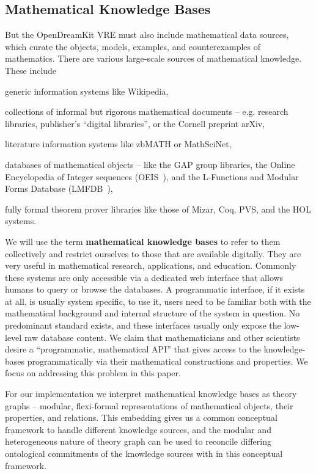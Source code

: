 \subsection{Mathematical Knowledge Bases}\label{sec:mkb}

But the \textsf{OpenDreamKit} VRE must also include mathematical data sources, which
curate the objects, models, examples, and counterexamples of mathematics.  There are
various large-scale sources of mathematical knowledge.  These include
\begin{compactitem}
\item generic information systems like Wikipedia,
\item collections of informal but rigorous mathematical documents -- e.g. research libraries, publisher's ``digital libraries'', or the Cornell preprint arXiv,
\item literature information systems like zbMATH or MathSciNet,
\item databases of mathematical objects -- like the GAP group libraries, the Online Encyclopedia of Integer sequences (OEIS~\cite{Sloane:OEIS,oeis}), and the L-Functions and Modular Forms Database (LMFDB~\cite{Cremona:LMFDB16,lmfdb:on}),
\item fully formal theorem prover libraries like those of Mizar, Coq, PVS, and the HOL systems.
\end{compactitem}
  
We will use the term \textbf{mathematical knowledge bases} to refer to them collectively and restrict ourselves to those that are available digitally.
They are very useful in mathematical research, applications, and education.  
Commonly these systems are only accessible via a dedicated web interface that allows humans to query or browse the databases. 
A programmatic interface, if it exists at all, is usually system specific, to use it, users need to be familiar both with the mathematical background and internal structure of the system in question.  
No predominant standard exists, and these interfaces usually only expose the low-level raw database content.
We claim that mathematicians and other scientists desire a ``programmatic, mathematical API'' that gives access to the knowledge-bases programmatically via their mathematical constructions and properties. 
We focus on addressing this problem in this paper.

For our implementation we interpret mathematical knowledge bases as \ommt theory graphs -- modular, flexi-formal representations of mathematical objects, their properties, and relations. 
This embedding gives us a common conceptual framework to handle different knowledge sources, and the modular and heterogeneous nature of \ommt theory graph can be used to reconcile differing ontological commitments of the knowledge sources with in this conceptual framework.



